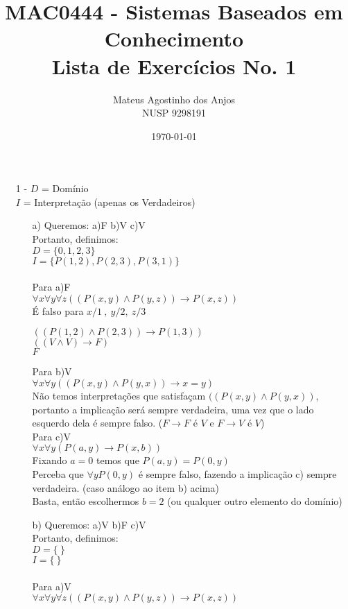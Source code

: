 \documentclass[12pt]{article}
\title{MAC0444 - Sistemas Baseados em Conhecimento \\
Lista de Exercícios No. 1
}
\author{Mateus Agostinho dos Anjos\\NUSP 9298191}
\date{\today}
\begin{document}
	\maketitle
	\begin{itemize}
		\item[1 -]
			$D$ = Domínio\\
			$I$ = Interpretação (apenas os Verdadeiros)\\
			\begin{itemize}
				\item[a)]
					Queremos: a)F b)V c)V\\
					Portanto, definimos:\\
					$D = \lbrace 0, 1, 2, 3 \rbrace$\\
					$I = \lbrace P(1, 2), P(2, 3), P(3, 1) \rbrace$\\ \\
					Para a)F\\
					$\forall x \forall y \forall z ((P(x,y) \wedge P(y,z)) \rightarrow P(x, z))$\\
					É falso para $x/1 \ , \ y/2, \ z/3$\\
					\begin{center}	
						$((P(1,2) \wedge P(2,3)) \rightarrow P(1, 3))$\\
						$((V \wedge V) \rightarrow F)$\\
						$F$
					\end{center}
					Para b)V\\
					$\forall x \forall y ((P(x,y) \wedge P(y,x)) \rightarrow x = y)$\\
					Não temos interpretações que satisfaçam $((P(x,y) \wedge P(y,x))$, portanto
					a implicação será sempre verdadeira, uma vez que o lado esquerdo dela é
					sempre falso. ($F \rightarrow F$ é $V$ e $F \rightarrow V$ é $V$)\\
					\newpage
					Para c)V\\
					$\forall x \forall y (P(a,y) \rightarrow P(x, b))$\\
					Fixando $a = 0$ temos que $P(a, y) = P(0, y)$\\
					Perceba que $\forall y P(0, y)$ é sempre falso, fazendo a implicação c)
					sempre verdadeira. (caso análogo ao item b) acima)\\
					Basta, então escolhermos $b = 2$ (ou qualquer outro elemento do domínio)
					
					\item[b)]
					Queremos: a)V b)F c)V\\
					Portanto, definimos:\\
					$D = \lbrace \ \rbrace$\\
					$I = \lbrace \ \rbrace$\\ \\
					Para a)V\\
					$\forall x \forall y \forall z ((P(x,y) \wedge P(y,z)) \rightarrow P(x, z))$\\
					

\end{itemize}
\end{itemize}
\end{document}
